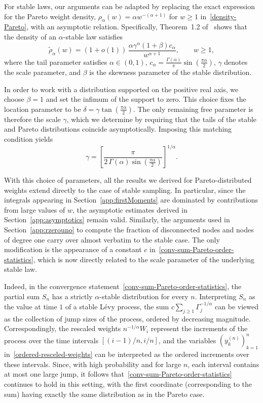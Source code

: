 \documentclass[ twocolumn,
 amsmath,amssymb,
 aps, pre, amsthm, amsfonts,
]{revtex4-2}
\newcommand{\sss}{\scriptscriptstyle}
\begin{document}
For stable laws, our arguments can be adapted by replacing the exact expression for the Pareto weight density,
$\rho_{\alpha}(w)=\alpha w^{-(\alpha+1)}$ for $w\geq 1$ in~\eqref{density-Pareto}, with an asymptotic relation. Specifically, Theorem~1.2 of~\cite{Nola20} shows that the density of an $\alpha$-stable law satisfies
\begin{equation}
\label{eq:density-stable}
    \tilde{\rho}_\alpha(w)=(1+o(1))\,\frac{\alpha \gamma^{\alpha}(1+\beta)c_\alpha}{w^{\alpha+1}}, 
    \qquad w\geq 1,
\end{equation}
where the tail parameter satisfies $\alpha\in(0,1)$, $c_\alpha=\frac{\Gamma(\alpha)}{\pi}\sin\!\left(\frac{\pi\alpha}{2}\right)$, $\gamma$ denotes the scale parameter, and $\beta$ is the skewness parameter of the stable distribution.

In order to work with a distribution supported on the positive real axis, we choose $\beta=1$ and set the infimum of the support to zero. This choice fixes the location parameter to be $\delta=\gamma\tan\!\left(\frac{\pi\alpha}{2}\right)$. The only remaining free parameter is therefore the scale $\gamma$, which we determine by requiring that the tails of the stable and Pareto distributions coincide asymptotically. Imposing this matching condition yields
\begin{equation}
    \gamma = \left[\frac{\pi}{2\,\Gamma(\alpha)\sin\!\left(\frac{\pi\alpha}{2}\right)}\right]^{1/\alpha}\label{eq:tails}.
\end{equation}

With this choice of parameters, all the results we derived for Pareto-distributed weights extend directly to the case of stable sampling. In particular, since the integrals appearing in Section~\ref{app:firstMoments} are dominated by contributions from large values of $w$, the asymptotic estimates derived in Section~\ref{app:asymptotics} remain valid. Similarly, the arguments used in Section~\ref{app:rzerouno} to compute the fraction of disconnected nodes and nodes of degree one carry over almost verbatim to the stable case. The only modification is the appearance of a constant $c$ in~\eqref{conv-sum-Pareto-order-statistics}, which is now directly related to the scale parameter of the underlying stable law.

Indeed, in the convergence statement~\eqref{conv-sum-Pareto-order-statistics}, the partial sum $S_n$ has a strictly $\alpha$-stable distribution for every $n$. Interpreting $S_n$ as the value at time $1$ of a stable Lévy process, the sum $c\sum_{j\geq 1}\Gamma_j^{-1/\alpha}$ can be viewed as the collection of jump sizes of the process, ordered by decreasing magnitude. Correspondingly, the rescaled weights $n^{-1/\alpha}W_i$ represent the increments of the process over the time intervals $[(i-1)/n,i/n]$, and the variables $(y_k^{\sss(n)})_{k=1}^n$ in~\eqref{ordered-resceled-weights} can be interpreted as the ordered increments over these intervals. Since, with high probability and for large $n$, each interval contains at most one large jump, it follows that~\eqref{conv-sum-Pareto-order-statistics} continues to hold in this setting, with the first coordinate (corresponding to the sum) having exactly the same distribution as in the Pareto case.
\end{document}
